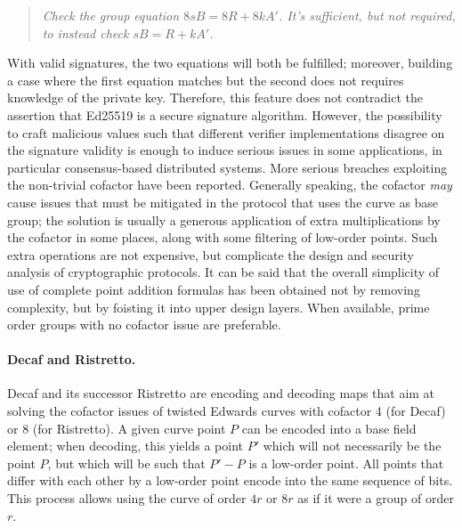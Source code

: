 \documentclass{llncs}
\begin{document}
    \begin{quote}
    \textit{Check the group equation $8sB = 8R + 8kA'$. It's sufficient,
    but not required, to instead check $sB = R + kA'$.}
    \end{quote}

With valid signatures, the two equations will both be fulfilled;
moreover, building a case where the first equation matches but the
second does not requires knowledge of the private key. Therefore, this
feature does not contradict the assertion that Ed25519 is a secure
signature algorithm. However, the possibility to craft malicious values
such that different verifier implementations disagree on the signature
validity is enough to induce serious issues in some applications, in
particular consensus-based distributed systems\cite{ZcashZip215}. More
serious breaches exploiting the non-trivial cofactor have been
reported\cite{MoneroBug2017}. Generally speaking, the cofactor
\emph{may} cause issues that must be mitigated in the protocol that uses
the curve as base group; the solution is usually a generous application
of extra multiplications by the cofactor in some places, along with some
filtering of low-order points. Such extra operations are not expensive,
but complicate the design and security analysis of cryptographic
protocols. It can be said that the overall simplicity of use of complete
point addition formulas has been obtained not by removing complexity,
but by foisting it into upper design layers. When available, prime order
groups with no cofactor issue are preferable\cite{CreJac2019}.

\paragraph{Decaf and Ristretto.} Decaf\cite{Ham2015} and its successor
Ristretto\cite{RistrettoWeb} are encoding and decoding maps that aim at
solving the cofactor issues of twisted Edwards curves with cofactor 4
(for Decaf) or 8 (for Ristretto). A given curve point $P$ can be encoded
into a base field element; when decoding, this yields a point $P'$ which
will not necessarily be the point $P$, but which will be such that
$P'-P$ is a low-order point. All points that differ with each other by a
low-order point encode into the same sequence of bits. This process
allows using the curve of order $4r$ or $8r$ as if it were a group of
order $r$.
\end{document}
